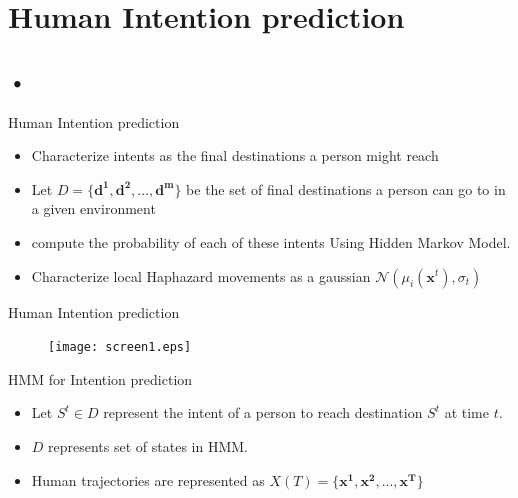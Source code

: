 \documentclass{beamer}
\begin{document}
\section{Human Intention prediction}

\subsection{•}

\begin{frame}{Human Intention prediction}
\begin{itemize}
\item{Characterize intents as the final destinations a person might reach}
\item{Let $D = \{\mathbf{d^1,d^2,...,d^m}\}$ be the set of final destinations a person can go to in a given environment}
\item{compute the probability of each of these intents Using Hidden Markov Model.}
\item{Characterize local Haphazard movements as a gaussian $\mathcal{N}(\mu_i(\mathbf{x}^{t}),\sigma_t)$ }
\end{itemize}
\end{frame}
\begin{frame}{Human Intention prediction}
\begin{figure}
\centering
\texttt{[image: screen1.eps]}
\end{figure}
\end{frame}
\begin{frame}{HMM for Intention prediction}
\begin{itemize}
\item{ Let $S^t \in D$ represent the intent of a person to reach destination $S^t$ at time $t$.}
\item{$D$ represents set of states in HMM.}
\item{Human trajectories are represented as $X(T) = \{\mathbf{x^1,x^2,...,x^T}\}$}
\end{itemize}

\end{frame}
\end{document}
